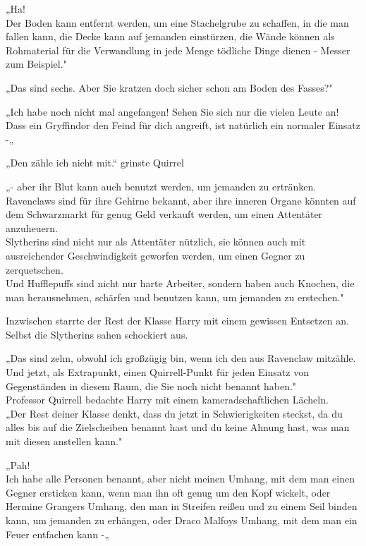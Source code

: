 {„Ha!\\ Der Boden kann entfernt werden, um eine Stachelgrube zu schaffen, in die man fallen kann, die Decke kann auf jemanden einstürzen, die Wände können als Rohmaterial für die Verwandlung in jede Menge tödliche Dinge dienen - Messer zum Beispiel."

„Das sind sechs. Aber Sie kratzen doch sicher schon am Boden des Fasses?"

„Ich habe noch nicht mal angefangen! Sehen Sie sich nur die vielen Leute an!\\ Dass ein Gryffindor den Feind für dich angreift, ist natürlich ein normaler Einsatz -„

„Den zähle ich nicht mit.“ grinste Quirrel

„- aber ihr Blut kann auch benutzt werden, um jemanden zu ertränken.\\ Ravenclaws sind für ihre Gehirne bekannt, aber ihre inneren Organe könnten auf dem Schwarzmarkt für genug Geld verkauft werden, um einen Attentäter anzuheuern.\\ Slytherins sind nicht nur als Attentäter nützlich, sie können auch mit ausreichender Geschwindigkeit geworfen werden, um einen Gegner zu zerquetschen.\\ Und Hufflepuffs sind nicht nur harte Arbeiter, sondern haben auch Knochen, die man herausnehmen, schärfen und benutzen kann, um jemanden zu erstechen."

Inzwischen starrte der Rest der Klasse Harry mit einem gewissen Entsetzen an.\\ Selbst die Slytherins sahen schockiert aus.

„Das sind zehn, obwohl ich großzügig bin, wenn ich den aus Ravenclaw mitzähle.\\ Und jetzt, als Extrapunkt, einen Quirrell-Punkt für jeden Einsatz von Gegenständen in diesem Raum, die Sie noch nicht benannt haben."\\ Professor Quirrell bedachte Harry mit einem kameradschaftlichen Lächeln.\\ „Der Rest deiner Klasse denkt, dass du jetzt in Schwierigkeiten steckst, da du alles bis auf die Zielscheiben benannt hast und du keine Ahnung hast, was man mit diesen anstellen kann."

„Pah!\\ Ich habe alle Personen benannt, aber nicht meinen Umhang, mit dem man einen Gegner ersticken kann, wenn man ihn oft genug um den Kopf wickelt, oder Hermine Grangers Umhang, den man in Streifen reißen und zu einem Seil binden kann, um jemanden zu erhängen, oder Draco Malfoys Umhang, mit dem man ein Feuer entfachen kann -„

}
